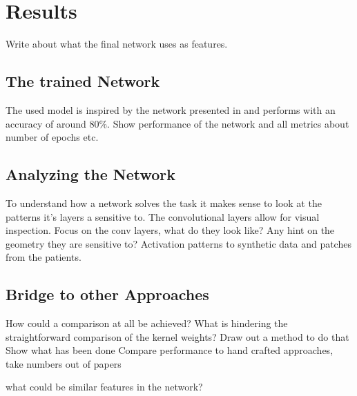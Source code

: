 \documentclass[main.tex]{subfiles}
\begin{document}
\chapter{Results}\label{chap:results}
Write about what the final network uses as features.
\section{The trained Network}
The used model is inspired by the network presented in \cite{huang2017lung} and performs with an accuracy of around 80$\%$.
Show performance of the network and all metrics about number of epochs etc.


\section{Analyzing the Network}
To understand how a network solves the task it makes sense to look at the patterns it's layers a sensitive to. The convolutional layers allow for visual inspection.
Focus on the conv layers, what do they look like? Any hint on the geometry they are sensitive to?
Activation patterns to synthetic data and patches from the patients.

\section{Bridge to other Approaches}
How could a comparison at all be achieved? What is hindering the straightforward comparison of the kernel weights? Draw out a method to do that
Show what has been done
Compare performance to hand crafted approaches, 
take numbers out of papers

what could be similar features in the network?
\end{document}
